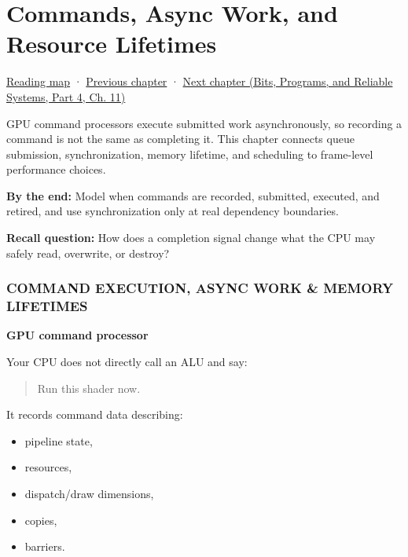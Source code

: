 \chapter{Commands, Async Work, and Resource Lifetimes}\label{01-foundations-i-ch012-commands-async-work-and-resource-lifetimes}\hypertarget{01-foundations-i-ch012}{}\label{stagechapter:01-foundations-i-ch012}

\hypertarget{01-foundations-i-ch012-commands-async-work-and-resource-lifetimes}{}

\hyperref[volume-reading-map]{Reading map} · \hyperref[01-foundations-i-ch011-c-const-borrowing-and-cpugpu-buffering]{Previous chapter} · \href{../01-Bits-Programs-and-Reliable-Systems-P04/main.pdf\#nameddest=05-engine-i-ch001}{Next chapter (Bits, Programs, and Reliable Systems, Part 4, Ch. 11)}

GPU command processors execute submitted work asynchronously, so recording a command is not the same as completing it. This chapter connects queue submission, synchronization, memory lifetime, and scheduling to frame-level performance choices.

\textbf{By the end:} Model when commands are recorded, submitted, executed, and retired, and use synchronization only at real dependency boundaries.

\textbf{Recall question:} How does a completion signal change what the CPU may safely read, overwrite, or destroy?

\subsection{COMMAND EXECUTION, ASYNC WORK \& MEMORY LIFETIMES}\label{01-foundations-i-ch012-command-execution-async-work-memory-lifetimes}

\hypertarget{01-foundations-i-ch012-command-execution-async-work-memory-lifetimes}{}

\textbf{GPU command processor}

Your CPU does not directly call an ALU and say:

\begin{quote}
Run this shader now.
\end{quote}

It records command data describing:

\begin{itemize}
\tightlist
\item
  pipeline state,
\item
  resources,
\item
  dispatch/draw dimensions,
\item
  copies,
\item
  barriers.
\end{itemize}


